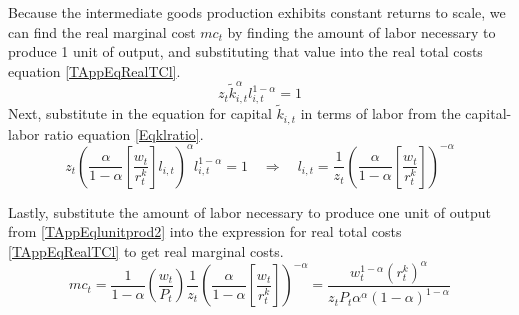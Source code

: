\documentclass[article,11pt,letterpaper,fleqn]{article}
\theoremstyle{definition}
\numberwithin{equation}{section}
\begin{document}
Because the intermediate goods production exhibits constant returns to scale, we can find the real marginal cost $mc_t$ by finding the amount of labor necessary to produce 1 unit of output, and substituting that value into the real total costs equation \eqref{TAppEqRealTCl}.
\begin{equation}\label{TAppEqlunitprod1}
   z_t\tilde{k}_{i,t}^\alpha l_{i,t}^{1-\alpha} = 1
\end{equation}
Next, substitute in the equation for capital $\tilde{k}_{i,t}$ in terms of labor from the capital-labor ratio equation \eqref{Eqklratio}.
\begin{equation}\label{TAppEqlunitprod2}
   z_t\left(\frac{\alpha}{1-\alpha}\left[\frac{w_t}{r_t^k}\right]l_{i,t}\right)^\alpha l_{i,t}^{1-\alpha} = 1 \quad\Rightarrow\quad l_{i,t} = \frac{1}{z_t}\left(\frac{\alpha}{1-\alpha}\left[\frac{w_t}{r_t^k}\right]\right)^{-\alpha}
\end{equation}

Lastly, substitute the amount of labor necessary to produce one unit of output from \eqref{TAppEqlunitprod2} into the expression for real total costs \eqref{TAppEqRealTCl} to get real marginal costs.
\begin{equation}\label{TAppEqRealMC}
   mc_t = \frac{1}{1-\alpha}\left(\frac{w_t}{P_t}\right)\frac{1}{z_t}\left(\frac{\alpha}{1-\alpha}\left[\frac{w_t}{r_t^k}\right]\right)^{-\alpha} = \frac{w_t^{1-\alpha}(r_t^k)^\alpha}{z_t P_t \alpha^\alpha (1-\alpha)^{1-\alpha}}
\end{equation}
\end{document}
